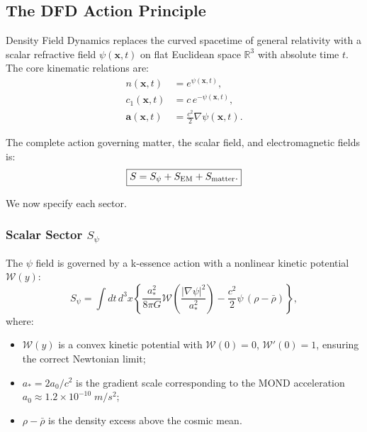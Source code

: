 \documentclass[aps,prd,twocolumn,superscriptaddress,floatfix,nofootinbib]{revtex4-2}
\newcommand{\avec}{\mathbf{a}}
\newcommand{\astar}{a_*}
\newcommand{\azero}{a_0}
\newcommand{\Wfunc}{\mathcal{W}}
\begin{document}
\subsection{The DFD Action Principle}\label{sec:action}

Density Field Dynamics replaces the curved spacetime of general
relativity with a scalar refractive field $\psi(\mathbf{x},t)$ on flat
Euclidean space $\mathbb{R}^3$ with absolute time $t$. The core
kinematic relations are:
\begin{align}
n(\mathbf{x},t) &= e^{\psi(\mathbf{x},t)}, \label{eq:n-def}\\
c_1(\mathbf{x},t) &= c\,e^{-\psi(\mathbf{x},t)}, \label{eq:c1-def}\\
\avec(\mathbf{x},t) &= \frac{c^2}{2}\nabla\psi(\mathbf{x},t).
\label{eq:a-def}
\end{align}

The complete action governing matter, the scalar field, and
electromagnetic fields is:
\begin{equation}
\boxed{S = S_\psi + S_{\rm EM} + S_{\rm matter}.}
\label{eq:full-action}
\end{equation}

We now specify each sector.

\subsubsection{Scalar Sector $S_\psi$}

The $\psi$ field is governed by a k-essence action with a nonlinear
kinetic potential $\Wfunc(y)$:
\begin{equation}
S_\psi = \int dt\,d^3x\left\{
  \frac{\astar^2}{8\pi G}\Wfunc\!\left(
  \frac{|\nabla\psi|^2}{\astar^2}\right)
  - \frac{c^2}{2}\psi\,(\rho - \bar{\rho})
\right\},
\label{eq:S-psi}
\end{equation}
where:
\begin{itemize}[nosep]
\item $\Wfunc(y)$ is a convex kinetic potential with $\Wfunc(0)=0$,
$\Wfunc'(0)=1$, ensuring the correct Newtonian limit;
\item $\astar = 2\azero/c^2$ is the gradient scale corresponding to the
MOND acceleration $\azero \approx 1.2 \times 10^{-10}\;\si{m/s^2}$;
\item $\rho - \bar{\rho}$ is the density excess above the cosmic mean.
\end{itemize}
\end{document}
